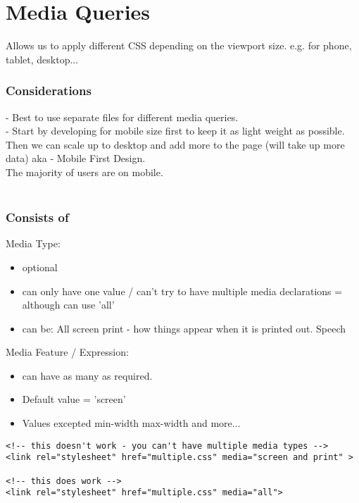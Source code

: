\documentclass[]{article}
\newcommand{\<}{\guilsinglleft}
\renewcommand{\>}{\guilsinglright}
\begin{document}
\section{Media Queries}
Allows us to apply different CSS depending on the viewport size. e.g. for phone, tablet, desktop...
\subsubsection{Considerations}
 - Best to use separate files for different media queries.
\\
 - Start by developing for mobile size first to keep it as light weight as possible.   Then we can scale up to desktop and add more to the page (will take up more data) aka - Mobile First Design.  \\
 The majority of users are on mobile.
\\\\
\subsubsection{Consists of}
Media Type:
\begin{itemize}
	\item optional
	\item can only have one value / can't try to have multiple media declarations = although can use 'all'
	
	\item can be:
	\subitem All
	\subitem screen
	\subitem print - how things appear when it is printed out.
	\subitem Speech
\end{itemize}

Media Feature / Expression:
\begin{itemize}
	\item can have as many as required.
	\item Default value = 'screen'
	\item Values excepted
	\subitem min-width 
	\subitem max-width
	\subitem and more...
\end{itemize}

\begin{lstlisting}
<!-- this doesn't work - you can't have multiple media types -->
<link rel="stylesheet" href="multiple.css" media="screen and print" >

<!-- this does work -->
<link rel="stylesheet" href="multiple.css" media="all">
\end{lstlisting}
\end{document}
